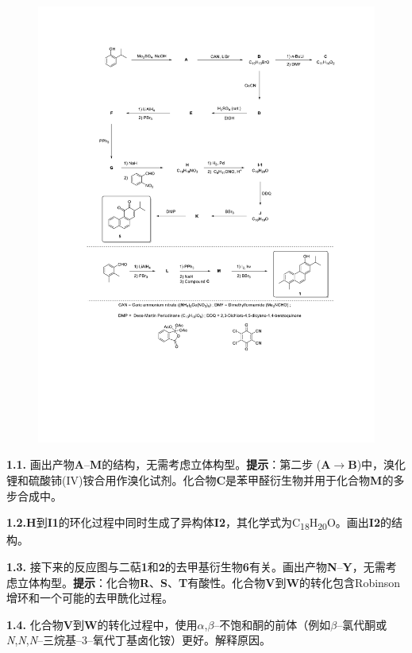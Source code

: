 \begin{figure}[h]
	\centering
	\includegraphics[width=16cm]{./pic/t1-3.pdf}
\end{figure}

\noindent\textbf{1.1.} 画出产物\textbf{A}--\textbf{M}的结构，无需考虑立体构型。\textbf{提示}：第二步 (\textbf{A}$\rightarrow$\textbf{B})中，溴化锂和硫酸铈(IV)铵合用作溴化试剂。化合物\textbf{C}是苯甲醛衍生物并用于化合物\textbf{M}的多步合成中。

\noindent\textbf{1.2.}\textbf{H}到\textbf{I1}的环化过程中同时生成了异构体\textbf{I2}，其化学式为C\textsubscript{18}H\textsubscript{20}O。画出\textbf{I2}的结构。

\noindent\textbf{1.3.} 接下来的反应图与二萜\textbf{1}和\textbf{2}的去甲基衍生物\textbf{6}有关。画出产物\textbf{N}--\textbf{Y}，无需考虑立体构型。\textbf{提示}：化合物\textbf{R}、\textbf{S}、\textbf{T}有酸性。化合物\textbf{V}到\textbf{W}的转化包含Robinson增环和一个可能的去甲酰化过程。

\newpage\noindent\textbf{1.4.} 化合物\textbf{V}到\textbf{W}的转化过程中，使用$\alpha$,$\beta$--不饱和酮的前体（例如$\beta$--氯代酮或\emph{N},\emph{N},\emph{N}--三烷基--3--氧代丁基卤化铵）更好。解释原因。

